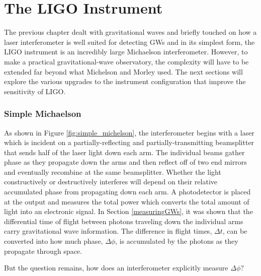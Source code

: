 	\chapter{The LIGO Instrument}\label{LIGOInstrument}
	The previous chapter dealt with gravitational waves and briefly touched on how a laser interferometer is well suited for detecting GWs and in its simplest form, the LIGO instrument is an incredibly large Michaelson interferometer. However, to make a practical gravitational-wave observatory, the complexity will have to be extended far beyond what Michelson and Morley used.  The next sections will explore the various upgrades to the instrument configuration that improve the sensitivity of LIGO.
	
		\subsection{Simple Michaelson}\label{sec:michelson}
		As shown in Figure \ref{fig:simple_michelson}, the interferometer begins with a laser which is incident on a partially-reflecting and partially-transmitting beamsplitter that sends half of the laser light down each arm.  The individual beams gather phase as they propagate down the arms and then reflect off of two end mirrors and eventually recombine at the same beamsplitter.  Whether the light constructively or destructively interferes will depend on their relative accumulated phase from propagating down each arm. A photodetector is placed at the output and measures the total power which converts the total amount of light into an electronic signal.  In Section \ref{measuringGWs}, it was shown that the differential time of flight between photons traveling down the individual arms carry gravitational wave information.  
		The difference in flight times, $\Delta t$, can be converted into how much phase, $\Delta \phi$, is accumulated by the photons as they propagate through space.  
		
		But the question remains, how does an interferometer explicitly measure $\Delta \phi$?
		
